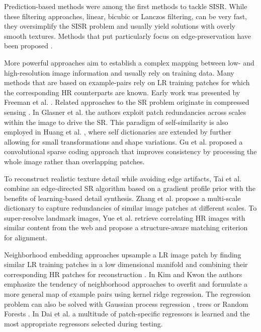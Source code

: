 \documentclass[10pt,twocolumn,letterpaper]{article}
\begin{document}
	Prediction-based methods were among the first methods to tackle \ac{SISR}. While these filtering approaches, \eg linear, bicubic or Lanczos \cite{Duchon1979} filtering, can be very fast, they oversimplify the \ac{SISR} problem and usually yield solutions with overly smooth textures.
	Methods that put particularly focus on edge-preservation have been proposed \cite{Allebach96, Li2001}.
	
	More powerful approaches aim to establish a complex mapping between low- and high-resolution image information and usually rely on training data. 
	Many methods that are based on example-pairs rely on \ac{LR} training patches for which the corresponding \ac{HR} counterparts are known. Early work was presented by Freeman et al. \cite{Freeman2000,Freeman2002}.
	Related approaches to the \ac{SR} problem originate in compressed sensing \cite{Yang08, Dong2011, zeyde2012single}.
	In Glasner et al. \cite{glasner2009super} the authors exploit patch redundancies across scales within the image to drive the \ac{SR}. This paradigm of self-similarity is also employed in Huang et al. \cite{Huang15selfexemplars}, where self dictionaries are extended by further allowing for small transformations and shape variations.
	Gu et al. \cite{gu2015convolutional} proposed a convolutional sparse coding approach that improves consistency by processing the whole image rather than overlapping patches.
	
	To reconstruct realistic texture detail while avoiding edge artifacts, Tai et al. \cite{Tai2010} combine an edge-directed \ac{SR} algorithm based on a gradient profile prior \cite{Sun2008} with the benefits of learning-based detail synthesis. Zhang et al. \cite{zhang2012multi} propose a multi-scale dictionary to capture redundancies of similar image patches at different scales. %
	To super-resolve landmark images, Yue et al. \cite{Yue2013} retrieve correlating \ac{HR} images with similar content from the web and propose a structure-aware matching criterion for alignment.
	
	Neighborhood embedding approaches upsample a \ac{LR} image patch by finding similar \ac{LR} training patches in a low dimensional manifold and combining their corresponding \ac{HR} patches for reconstruction \cite{timofte2013anchored,timofte2014a+}.
	In Kim and Kwon \cite{Kim10kernelregression} the authors emphasize the tendency of neighborhood approaches to overfit and formulate a more general map of example pairs using kernel ridge regression.
	The regression problem can also be solved with Gaussian process regression \cite{he2011single}, trees \cite{salvador2015naive} or Random Forests \cite{schulter2015fast}.
	In Dai et al. \cite{dai2015jointly} a multitude of patch-specific regressors is learned and the most appropriate regressors selected during testing. %
 
\end{document}

